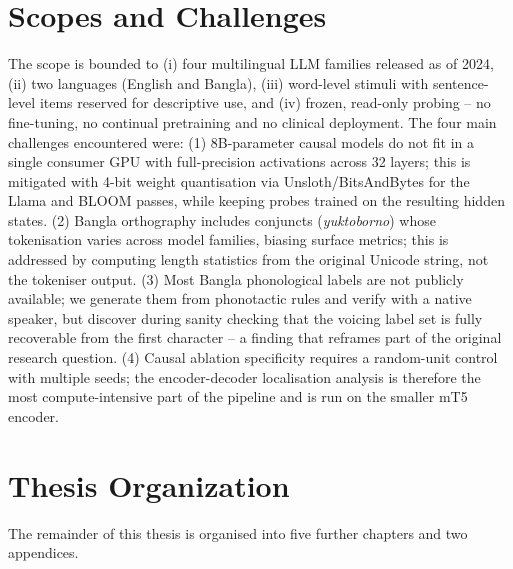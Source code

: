 \section{Scopes and Challenges}

The scope is bounded to (i) four multilingual LLM families released as of 2024, (ii) two languages (English and Bangla), (iii) word-level stimuli with sentence-level items reserved for descriptive use, and (iv) frozen, read-only probing -- no fine-tuning, no continual pretraining and no clinical deployment. The four main challenges encountered were: (1) 8B-parameter causal models do not fit in a single consumer GPU with full-precision activations across 32 layers; this is mitigated with 4-bit weight quantisation via Unsloth/BitsAndBytes \cite{dettmers2022bnb} for the Llama and BLOOM passes, while keeping probes trained on the resulting hidden states. (2) Bangla orthography includes conjuncts (\textit{yuktoborno}) whose tokenisation varies across model families, biasing surface metrics; this is addressed by computing length statistics from the original Unicode string, not the tokeniser output. (3) Most Bangla phonological labels are not publicly available; we generate them from phonotactic rules and verify with a native speaker, but discover during sanity checking that the voicing label set is fully recoverable from the first character -- a finding that reframes part of the original research question. (4) Causal ablation specificity requires a random-unit control with multiple seeds; the encoder-decoder localisation analysis is therefore the most compute-intensive part of the pipeline and is run on the smaller mT5 encoder.

\section{Thesis Organization}

The remainder of this thesis is organised into five further chapters and two appendices.

